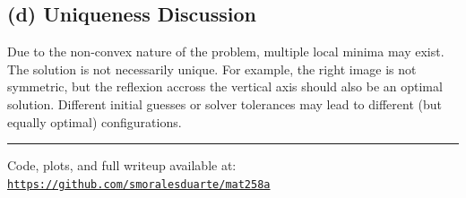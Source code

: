 \documentclass[11pt]{article}
\begin{document}
\subsection*{(d) Uniqueness Discussion}

Due to the non-convex nature of the problem, multiple local minima may exist. The solution is not necessarily unique. For example, the right image is not symmetric, but the reflexion accross the vertical axis should also be an optimal solution. Different initial guesses or solver tolerances may lead to different (but equally optimal) configurations.

\vspace{1em}
\hrule
\vspace{1em}
\noindent Code, plots, and full writeup available at:  
\texttt{\href{https://github.com/smoralesduarte/mat258a/blob/main/spheres.ipynb}{https://github.com/smoralesduarte/mat258a}}
\end{document}
